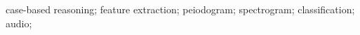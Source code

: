 \begin{IEEEkeywords}
case-based reasoning; feature extraction; peiodogram; spectrogram; classification;
audio;
\end{IEEEkeywords}
